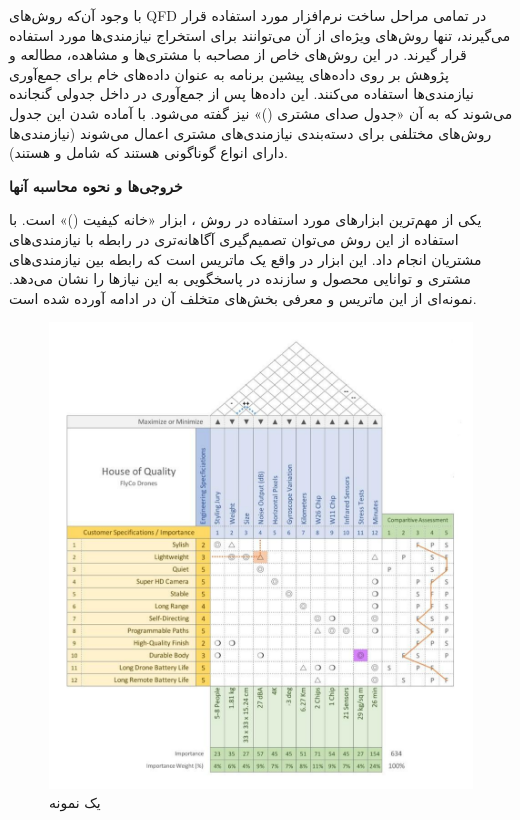 {\begin{enumerate}[a)]
با وجود آن‌که روش‌های QFD در تمامی مراحل ساخت نرم‌افزار مورد استفاده قرار می‌گیرند، تنها روش‌های ویژه‌ای از آن می‌توانند برای استخراج نیازمندی‌ها مورد استفاده قرار گیرند. در این روش‌های خاص از مصاحبه با مشتری‌ها و مشاهده، مطالعه و پژوهش‌ بر روی داده‌های پیشین برنامه به عنوان داده‌های خام برای جمع‌آوری نیازمندی‌ها استفاده می‌کنند. این داده‌ها پس از جمع‌آوری در داخل جدولی گنجانده می‌شوند که به آن «جدول صدای مشتری ()» نیز گفته می‌شود. با آماده شدن این جدول روش‌های مختلفی برای دسته‌بندی نیازمندی‌های مشتری اعمال می‌شوند (نیازمندی‌ها دارای انواع گوناگونی هستند که شامل  و  هستند)\cite{swbook}.

\textbf{خروجی‌ها و نحوه محاسبه آنها}

یکی از مهم‌ترین ابزارهای مورد استفاده در روش ، ابزار «خانه کیفیت ()» است\cite{sixsigma}. با استفاده از این روش می‌توان تصمیم‌گیری آگاهانه‌تری در رابطه با نیازمندی‌های مشتریان انجام داد. این ابزار در واقع یک ماتریس است که رابطه بین نیازمندی‌های مشتری و توانایی محصول و سازنده در پاسخگویی به این نیازها را نشان می‌دهد. نمونه‌ای از این ماتریس و معرفی بخش‌های متخلف آن در ادامه آورده شده است.

\begin{figure}[h]
	\centering
	\includegraphics[scale=0.55]{figs/2-1.pdf}
	\caption{یک نمونه }
	\label{fig2}
\end{figure}


\end{enumerate}}
